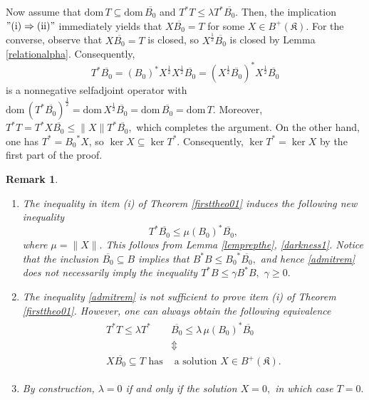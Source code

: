 \documentclass{amsart}
\makeatletter
\newtheorem{remark}[theorem]{Remark}
\newcommand{\n}{\|}
\newcommand{\kk}{\mathfrak{K}}
\newcommand{\D}{\mathrm{dom}\,}
\newcommand{\DT}{\mathrm{dom}\,T }
\newcommand{\adj}{^*}
\newcommand{\tstar}{T^{*}}
\newcommand{\half}{^{\frac{1}{2}}}
\newcommand{\inclu}{\subseteq}
\newcommand{\lplusk}{B^{+}(\kk)}
\numberwithin{equation}{section}
\renewenvironment{proof}[1][\proofname]{%
   \par\pushQED{\qed}\normalfont%
   \topsep6\p@\@plus6\p@\relax
   \trivlist\item[\hskip\labelsep\bfseries#1\@addpunct{.}]%
   \ignorespaces
}{%
   \popQED\endtrivlist\@endpefalse
}
\renewcommand{\labelenumi}{(\arabic{enumi})}
\makeatother
\begin{document}
\begin{proof}
   Now assume  that $\DT \inclu \D \overline{B_0}$ and $  T^* T  \leq \lambda \tstar \overline{B_0}.$  Then,  the implication $\rm "(i)  \Rightarrow (ii)"$ immediately yields that $X\overline{B_0}= T$ for some $X \in \lplusk.$ For the converse, observe that $X \overline{B_0}= T$ is closed, so   $X\half \overline{B_0}$ is closed by  Lemma  \ref{relationalpha}. Consequently,
    $$
    \tstar \overline{B_0} = (B_0)\adj X \half X\half \overline{B_0}= (  X\half \overline{B_0})\adj  X\half \overline{B_0}$$
    is a nonnegative selfadjoint operator with $\D ( \tstar \overline{B_0})\half = \D X\half \overline{B_0} = \D \overline{B_0}= \DT.$ Moreover,
    $
    \tstar T = \tstar  X \overline{B_0} \leq  \n X \n \tstar \overline{B_0},$  which completes the argument. On the other hand, one has $\tstar = {B_0}\adj X$, so $\ker X \inclu \ker \tstar.$ Consequently, $\ker \tstar = \ker X$ by the first part of the proof.
\end{proof}



 \begin{remark}\label{remark1}\normalfont
   \begin{enumerate}\def\labelenumi{\rm(\roman{enumi})}
\item The inequality in item (i) of Theorem \ref{firsttheo01} induces  the following new inequality
\begin{equation}\label{admitrem}
 \tstar \overline{B_0} \leq \mu (B_0)\adj   \overline{B_0},
\end{equation}
where $\mu = \n X \n. $  This follows from Lemma \ref{lemprepthe}, \eqref{darkness1}. Notice that the inclusion $\overline{B_0} \inclu B$ implies that   $B\adj B \leq  {B_0}\adj \overline{B_0},$ and hence \eqref{admitrem} does not necessarily imply  the inequality $\tstar B \leq \gamma B\adj B,$ $\gamma \geq 0.$
\item
The inequality  \eqref{admitrem} is not sufficient to prove item (i) of Theorem \ref{firsttheo01}. However, one can always obtain the following equivalence
 \begin{align} \label{3equiv}
\begin{split}
  T^* T  \leq \lambda  \tstar   & \overline{B_0}  \leq \lambda  \, \mu (B_0)\adj   \overline{B_0} \\
    & \Updownarrow \\
        X\overline{B_0} \inclu  T \text{ has} & \text{ a solution } X \in \lplusk.
\end{split}
\end{align}
 \item  By construction,  $\lambda = 0$ if and only if  the solution $X=0,$ in which case $T=0.$
\end{enumerate}
 \end{remark}
\end{document}
